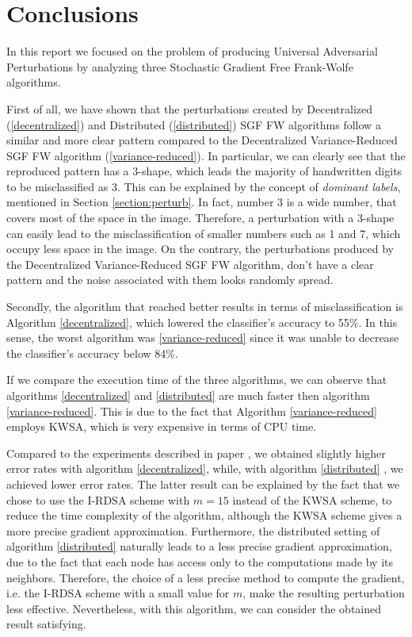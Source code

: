 \section{Conclusions}
In this report we focused on the problem of producing Universal Adversarial Perturbations by analyzing three
Stochastic Gradient Free Frank-Wolfe algorithms.

First of all, we have shown that the perturbations created by Decentralized (\ref{decentralized}) and Distributed (\ref{distributed})
SGF FW algorithms follow a similar and more clear pattern compared to the Decentralized Variance-Reduced SGF FW
algorithm (\ref{variance-reduced}). In particular, we can clearly see that the reproduced pattern has a 3-shape, which
leads the majority of handwritten digits to be misclassified as 3. This can be explained by the concept of \textit{dominant labels},
mentioned in Section \ref{section:perturb}. In fact, number 3 is a wide number, that covers most of the space in the image. Therefore, a
perturbation with a 3-shape can easily lead to the misclassification of smaller numbers such as 1 and 7, which occupy
less space in the image. On the contrary, the perturbations produced by the Decentralized Variance-Reduced SGF FW algorithm,
don't have a clear pattern and the noise associated with them looks randomly spread.

Secondly, the algorithm that reached better results in terms of misclassification is Algorithm \ref{decentralized},
which lowered the classifier's accuracy to 55\%. In this sense, the worst algorithm was \ref{variance-reduced} since
it was unable to decrease the classifier's accuracy below 84\%.

If we compare the execution time of the three algorithms, we can observe that algorithms \ref{decentralized} and \ref{distributed}
are much faster then algorithm \ref{variance-reduced}. This is due to the fact that Algorithm \ref{variance-reduced}
employs KWSA, which is very expensive in terms of CPU time.

Compared to the experiments described in paper \cite{A3}, we obtained slightly higher error rates with algorithm
\ref{decentralized}, while, with algorithm \ref{distributed} , we achieved lower error rates. The latter result can be
explained by the fact that we chose to use the I-RDSA scheme with $m=15$ instead of the KWSA scheme, to reduce the time
complexity of the algorithm, although the KWSA scheme gives a more precise gradient approximation. Furthermore, the
distributed setting of algorithm \ref{distributed} naturally leads to a less precise gradient approximation, due to the
fact that each node has access only to the computations made by its neighbors. Therefore, the choice of a less precise
method to compute the gradient, i.e. the I-RDSA scheme with a small value for $m$, make the resulting perturbation
less effective. Nevertheless, with this algorithm, we can consider the obtained result satisfying.


